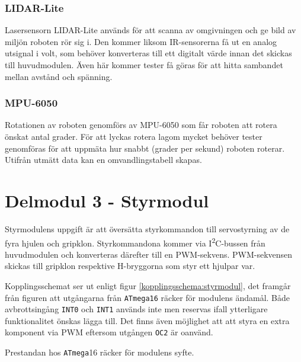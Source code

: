\documentclass[11pt]{article}
\begin{document}
\begin{flushleft}
\FloatBarrier
\subsubsection{LIDAR-Lite}
Lasersensorn LIDAR-Lite används för att scanna av omgivningen och ge bild av miljön roboten rör sig i. Den kommer liksom IR-sensorerna få ut en analog utsignal i volt, som behöver konverteras till ett digitalt värde innan det skickas till huvudmodulen. Även här kommer tester få göras för att hitta sambandet mellan avstånd och spänning.

\subsubsection{MPU-6050}
Rotationen av roboten genomförs av MPU-6050 som får roboten att rotera önskat antal grader. För att lyckas rotera lagom mycket behöver tester genomföras för att uppmäta hur snabbt (grader per sekund) roboten roterar. Utifrån utmätt data kan en omvandlingstabell skapas.

\pagebreak
\section{Delmodul 3 - Styrmodul}
Styrmodulens uppgift är att översätta styrkommandon till servostyrning av de fyra hjulen och gripklon. Styrkommandona kommer via I\textsuperscript{2}C-bussen från huvudmodulen och konverteras därefter till en PWM-sekvens. PWM-sekvensen skickas till gripklon respektive H-bryggorna som styr ett hjulpar var. 

Kopplingsschemat ser ut enligt figur \ref{kopplingsschema:styrmodul}, det framgår från figuren att utgångarna från \verb+ATmega16+ räcker för modulens ändamål. Både avbrottsingång \verb+INT0+ och \verb+INT1+ används inte men reservas ifall ytterligare funktionalitet önskas lägga till. Det finns även möjlighet att att styra en extra komponent via PWM eftersom utgången \verb+OC2+ är oanvänd.  

Prestandan hos \verb+ATmega+16 räcker för modulens syfte. 


\end{flushleft}
\end{document}
